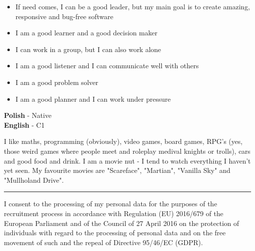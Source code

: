 \documentclass[9pt]{developercv}%
\begin{document}
	\begin{itemize}
		\item If need comes, I can be a good leader, but my main goal is to create amazing, responsive and bug-free software
		\item I am a good learner and a good decision maker
		\item I can work in a group, but I can also work alone
		\item I am a good listener and I can communicate well with others
		\item I am a good problem solver
		\item I am a good planner and I can work under pressure
	\end{itemize}
\vspace{0.5cm}

\begin{minipage}[t]{0.3\textwidth}
	\vspace{-\baselineskip} %

	
  \textbf{Polish} - Native \\ 
	\textbf{English} - C1 
\end{minipage}
\hfill
\begin{minipage}[t]{0.7\textwidth}
	\vspace{-\baselineskip} %
	
	
	I like maths, programming (obviously), video games, board games, RPG's (yes, those weird games where people meet and roleplay medival knights or trolls), cars and good food and drink. I am a movie nut - I tend to watch everything I haven't yet seen. My favourite movies are "Scareface", "Martian", "Vanilla Sky" and "Mullholand Drive".
\end{minipage}
\vspace{1.5cm}

\noindent\rule{8cm}{0.4pt}

I consent to the processing of my personal data for the purposes of the recruitment process in accordance with Regulation (EU) 2016/679 of the European Parliament and of the Council of 27 April 2016 on the protection of individuals with regard to the processing of personal data and on the free movement of such and the repeal of Directive 95/46/EC (GDPR).
\end{document}

